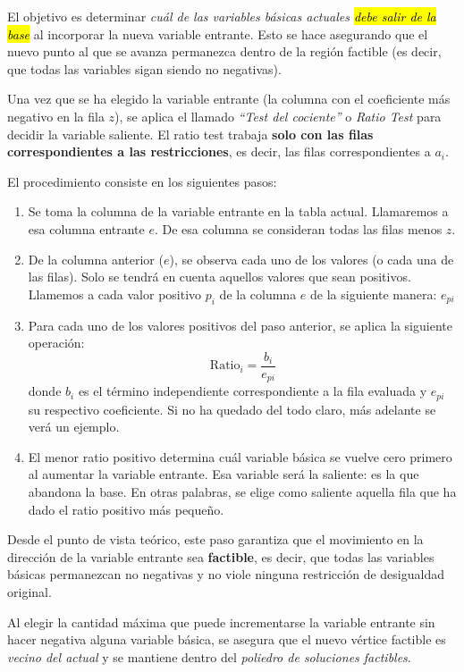 El objetivo es determinar \textit{cuál de las variables básicas actuales \hl{debe salir de la base}} al incorporar la nueva variable entrante. Esto se hace asegurando que el nuevo punto al que se avanza permanezca dentro de la región factible (es decir, que todas las variables sigan siendo no negativas).

Una vez que se ha elegido la variable entrante (la columna con el coeficiente más negativo en la fila \(z\)), se aplica el llamado \textit{``Test del cociente''} o \emph{Ratio Test} para decidir la variable saliente. El ratio test trabaja \textbf{solo con las filas correspondientes a las restricciones}, es decir, las filas correspondientes a \(a_i\).

El procedimiento consiste en los siguientes pasos:
\begin{enumerate}
  \item Se toma la columna de la variable entrante en la tabla actual. Llamaremos a esa columna entrante \(e\). De esa columna se consideran todas las filas menos \(z\).
  \item De la columna anterior (\(e\)), se observa cada uno de los valores (o cada una de las filas). Solo se tendrá en cuenta aquellos valores que sean positivos. Llamemos a cada valor positivo \(p_i\) de la columna \(e\) de la siguiente manera: \(e_{pi}\)
  \item Para cada uno de los valores positivos del paso anterior, se aplica la siguiente operación:
  \[
    \text{Ratio}_i = \frac{b_i}{e_{pi}}
  \]
  donde \(b_i\) es el término independiente correspondiente a la fila evaluada y \(e_{pi}\) su respectivo coeficiente. Si no ha quedado del todo claro, más adelante se verá un ejemplo.
  \item El menor ratio positivo determina cuál variable básica se vuelve cero primero al aumentar la variable entrante. Esa variable será la saliente: es la que abandona la base. En otras palabras, se elige como saliente aquella fila que ha dado el ratio positivo más pequeño.
\end{enumerate}

Desde el punto de vista teórico, este paso garantiza que el movimiento en la dirección de la variable entrante sea \textbf{factible}, es decir, que todas las variables básicas permanezcan no negativas y no viole ninguna restricción de desigualdad original.

Al elegir la cantidad máxima que puede incrementarse la variable entrante sin hacer negativa alguna variable básica, se asegura que el nuevo vértice factible es \emph{vecino del actual} y se mantiene dentro del \emph{poliedro de soluciones factibles}.

